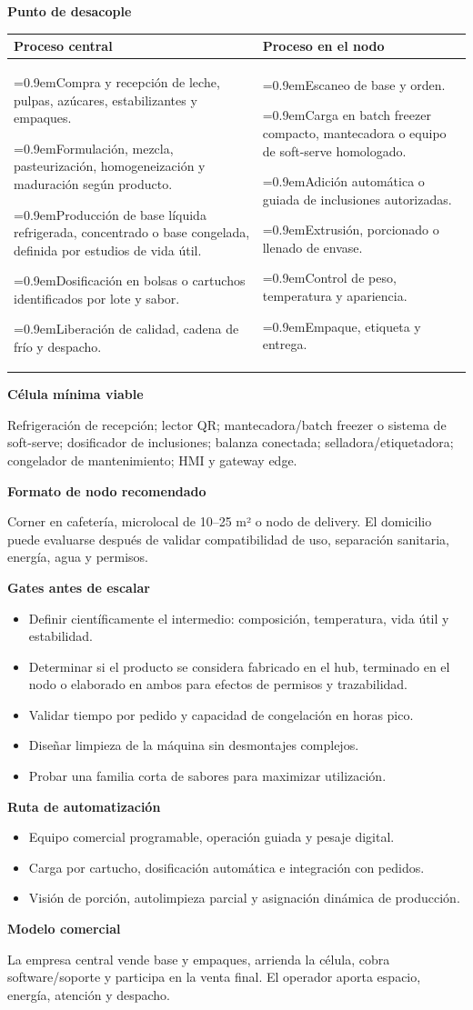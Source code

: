 \documentclass[11pt,a4paper]{article}
\makeatletter
\newcommand{\etiqueta}[1]{\par\medskip\noindent\textbf{#1}\par\nopagebreak\smallskip}
\newcommand{\ti}{\par\hangindent=0.9em\hangafter=1\noindent\makebox[0.9em][l]{\textbullet}}
\newcommand{\desacople}[2]{\etiqueta{Punto de desacople}
  {\small\noindent\begin{tabularx}{\textwidth}{@{}>{\raggedright\arraybackslash}X>{\raggedright\arraybackslash}X@{}}
  \toprule \textbf{Proceso central} & \textbf{Proceso en el nodo}\\ \midrule
  #1 & #2\\ \bottomrule\end{tabularx}}\par}
\newcommand{\rutas}[3]{\etiqueta{Ruta de automatización}
  \begin{itemize}[leftmargin=2.6em,labelwidth=2em]
  \item[\textbf{1.0}] #1
  \item[\textbf{2.0}] #2
  \item[\textbf{3.0}] #3
  \end{itemize}}
\makeatother
\begin{document}
\desacople{%
\ti Compra y recepción de leche, pulpas, azúcares, estabilizantes y empaques.
\ti Formulación, mezcla, pasteurización, homogeneización y maduración según producto.
\ti Producción de base líquida refrigerada, concentrado o base congelada, definida por estudios de vida útil.
\ti Dosificación en bolsas o cartuchos identificados por lote y sabor.
\ti Liberación de calidad, cadena de frío y despacho.}{%
\ti Escaneo de base y orden.
\ti Carga en batch freezer compacto, mantecadora o equipo de soft-serve homologado.
\ti Adición automática o guiada de inclusiones autorizadas.
\ti Extrusión, porcionado o llenado de envase.
\ti Control de peso, temperatura y apariencia.
\ti Empaque, etiqueta y entrega.}

\etiqueta{Célula mínima viable}
Refrigeración de recepción; lector QR; mantecadora/batch freezer o sistema de soft-serve; dosificador de
inclusiones; balanza conectada; selladora/etiquetadora; congelador de mantenimiento; HMI y gateway edge.

\etiqueta{Formato de nodo recomendado}
Corner en cafetería, microlocal de 10--25 m² o nodo de delivery. El domicilio puede evaluarse después de
validar compatibilidad de uso, separación sanitaria, energía, agua y permisos.

\etiqueta{Gates antes de escalar}
\begin{itemize}
\item Definir científicamente el intermedio: composición, temperatura, vida útil y estabilidad.
\item Determinar si el producto se considera fabricado en el hub, terminado en el nodo o elaborado en
ambos para efectos de permisos y trazabilidad.
\item Validar tiempo por pedido y capacidad de congelación en horas pico.
\item Diseñar limpieza de la máquina sin desmontajes complejos.
\item Probar una familia corta de sabores para maximizar utilización.
\end{itemize}

\rutas{Equipo comercial programable, operación guiada y pesaje digital.}
{Carga por cartucho, dosificación automática e integración con pedidos.}
{Visión de porción, autolimpieza parcial y asignación dinámica de producción.}

\etiqueta{Modelo comercial}
La empresa central vende base y empaques, arrienda la célula, cobra software/soporte y participa en la
venta final. El operador aporta espacio, energía, atención y despacho.
\end{document}
